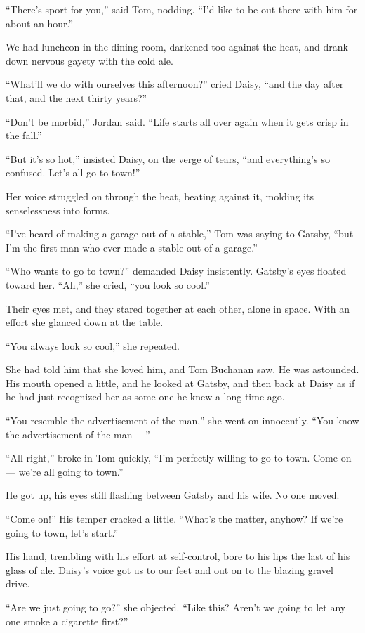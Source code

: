 \documentclass{znotebook}
\begin{document}
``There's sport for you,'' said Tom, nodding. ``I'd like to be out there with him for about an hour.''

We had luncheon in the dining-room, darkened too against the heat, and drank down nervous gayety with the cold ale.

``What'll we do with ourselves this afternoon?'' cried Daisy, ``and the day after that, and the next thirty years?''

``Don't be morbid,'' Jordan said. ``Life starts all over again when it gets crisp in the fall.''

``But it's so hot,'' insisted Daisy, on the verge of tears, ``and everything's so confused. Let's all go to town!''

Her voice struggled on through the heat, beating against it, molding its senselessness into forms.

``I've heard of making a garage out of a stable,'' Tom was saying to Gatsby, ``but I'm the first man who ever made a stable out of a garage.''

``Who wants to go to town?'' demanded Daisy insistently. Gatsby's eyes floated toward her. ``Ah,'' she cried, ``you look so cool.''

Their eyes met, and they stared together at each other, alone in space. With an effort she glanced down at the table.

``You always look so cool,'' she repeated.

She had told him that she loved him, and Tom Buchanan saw. He was astounded. His mouth opened a little, and he looked at Gatsby, and then back at Daisy as if he had just recognized her as some one he knew a long time ago.

``You resemble the advertisement of the man,'' she went on innocently. ``You know the advertisement of the man ---''

``All right,'' broke in Tom quickly, ``I'm perfectly willing to go to town. Come on ---{} we're all going to town.''

He got up, his eyes still flashing between Gatsby and his wife. No one moved.

``Come on!'' His temper cracked a little. ``What's the matter, anyhow? If we're going to town, let's start.''

His hand, trembling with his effort at self-control, bore to his lips the last of his glass of ale. Daisy's voice got us to our feet and out on to the blazing gravel drive.

``Are we just going to go?'' she objected. ``Like this? Aren't we going to let any one smoke a cigarette first?''
\end{document}
